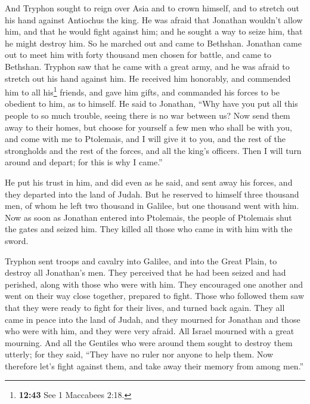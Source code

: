 And Tryphon sought to reign over Asia and to crown
himself, and to stretch out his hand against Antiochus the king.
 He was afraid that Jonathan wouldn't allow him, and that
he would fight against him; and he sought a way to seize him, that he
might destroy him. So he marched out and came to Bethshan.
 Jonathan came out to meet him with forty thousand men
chosen for battle, and came to Bethshan.  Tryphon saw
that he came with a great army, and he was afraid to stretch out his
hand against him.  He received him honorably, and
commended him to all his\footnote{\textbf{12:43} See 1 Maccabees 2:18.}
friends, and gave him gifts, and commanded his forces to be obedient to
him, as to himself.  He said to Jonathan, ``Why have you
put all this people to so much trouble, seeing there is no war between
us?  Now send them away to their homes, but choose for
yourself a few men who shall be with you, and come with me to Ptolemais,
and I will give it to you, and the rest of the strongholds and the rest
of the forces, and all the king's officers. Then I will turn around and
depart; for this is why I came.''

 He put his trust in him, and did even as he said, and
sent away his forces, and they departed into the land of Judah.
 But he reserved to himself three thousand men, of whom
he left two thousand in Galilee, but one thousand went with him.
 Now as soon as Jonathan entered into Ptolemais, the
people of Ptolemais shut the gates and seized him. They killed all those
who came in with him with the sword.

 Tryphon sent troops and cavalry into Galilee, and into
the Great Plain, to destroy all Jonathan's men.  They
perceived that he had been seized and had perished, along with those who
were with him. They encouraged one another and went on their way close
together, prepared to fight.  Those who followed them saw
that they were ready to fight for their lives, and turned back again.
 They all came in peace into the land of Judah, and they
mourned for Jonathan and those who were with him, and they were very
afraid. All Israel mourned with a great mourning.  And
all the Gentiles who were around them sought to destroy them utterly;
for they said, ``They have no ruler nor anyone to help them. Now
therefore let's fight against them, and take away their memory from
among men.''

